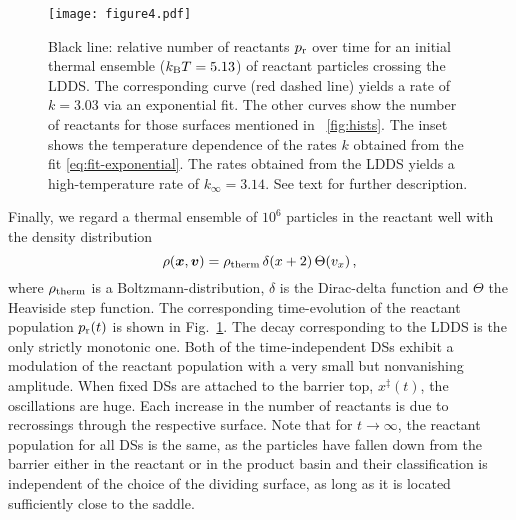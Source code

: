 \documentclass{elsarticle}
\begin{document}
\begin{figure}[t]
 \texttt{[image: figure4.pdf]}
\caption{%
Black line: relative number of reactants $p_\mathrm{r}$ over time for an 
initial thermal ensemble ($k_\mathrm{B}T = 5.13$) of reactant particles crossing 
the 
LDDS. 
The corresponding curve (red dashed line) yields a rate of $k=3.03$ via an 
exponential fit. 
The other curves show the number of reactants for those surfaces mentioned in 
\FIG~\ref{fig:hists}. 
% 
The inset shows the temperature dependence of the rates $k$ obtained from the 
fit \eqref{eq:fit-exponential}.
The rates obtained from the LDDS yields a high-temperature rate of $k_\infty = 
3.14$. 
See text for further description. 
}
\label{fig:rate_calculation}
\end{figure}



Finally, we regard a thermal ensemble of $10^6$ particles in the reactant 
well with the density distribution
% 
\begin{equation}
\rho(\boldsymbol{x}, \boldsymbol{v}) = \rho_\mathrm{therm}\,\delta(x+2)\,\Theta(v_x) \,,
\end{equation}
% 
where $\rho_\mathrm{therm}$ is a Boltzmann-distribution, $\delta$ is the 
Dirac-delta 
function and $\Theta$ the Heaviside step function. 
The corresponding time-evolution of the reactant population $p_\mathrm{r}(t)$
is shown in Fig.~\ref{fig:rate_calculation}.
The decay corresponding to the LDDS is the only strictly monotonic one.
Both of the time-independent DSs
exhibit a modulation of the 
reactant population with a very small but nonvanishing amplitude.
When fixed DSs are attached to the barrier top, $x^\ddagger(t)$, the 
oscillations are huge.
Each increase in the number of reactants is due to recrossings through the 
respective surface. 
Note that for $t\rightarrow \infty$, the reactant population for all DSs is the 
same, as the particles have fallen down from the barrier either in the reactant 
or in the product basin and their classification is independent of the 
choice of the dividing surface, as long as it is located sufficiently close to 
the saddle.
\end{document}
